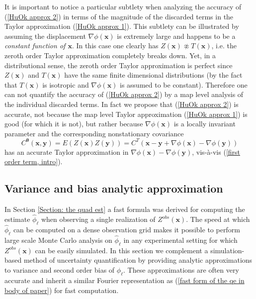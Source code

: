 \documentclass[10pt,noinfoline]{imsart}
\newcommand{\bs}{\boldsymbol}
\begin{document}
It is important to notice a particular subtlety when analyzing the accuracy of  (\ref{HuOk approx 2}) in terms of the magnitude of the discarded terms in the Taylor approximation (\ref{HuOk approx 1}). This subtlety can be illustrated by assuming the displacement $\nabla \phi(\bs x)$ is extremely large and happens to be a \textit{constant function of $\bs x$}. In this case one clearly has $Z(\bs x) \not\approx T(\bs x)$, i.e. the zeroth order Taylor approximation completely breaks down. Yet, in a distributional sense, the zeroth order Taylor approximation is perfect since $Z(\bs x)$ and $T(\bs x)$ have the same finite dimensional distributions (by the fact that $T(\bs x)$ is isotropic and $\nabla \phi(\bs x)$ is assumed to be constant).
Therefore one can not quantify the accuracy of (\ref{HuOk approx 2}) by a map level analysis of the individual discarded terms.
In fact we propose that (\ref{HuOk approx 2}) is accurate, not because the map level Taylor approximation (\ref{HuOk approx 1}) is good (for which it is not), but rather because $\nabla \phi(\bs x)$ is a locally invariant parameter and the corresponding nonstationary covariance
\[
C^{\bs \theta}(\bs x,\bs y)=E(Z(\bs x)Z(\bs y)) = C^T(\bs x - \bs y + \nabla\phi(\bs x) - \nabla\phi(\bs y))
\]
has an accurate Taylor approximation in $\nabla\phi(\bs x) - \nabla\phi(\bs y)$, vis-\`a-vis (\ref{first order term, intro}).



\subsection{Variance and bias analytic approximation}
\label{Section: var and bias}

In Section \ref{Section: the quad est} a fast formula was derived for computing the estimate $\hat \phi_{\bs \ell}$ when observing a single realization of $Z^{obs}(\bs x)$. The speed at which $\hat \phi_{\bs \ell}$ can be computed on a dense observation grid makes it possible to perform large scale Monte Carlo analysis on $\hat\phi_{\bs \ell}$ in any experimental setting for which $Z^{obs}(\bs x)$ can be easily simulated. In this section we complement a simulation-based method of uncertainty quantification by providing analytic approximations to variance and second order bias of $\hat\phi_{\bs \ell}$. These approximations are often very accurate and inherit a similar Fourier representation as (\ref{fast form of the qe in body of paper}) for fast computation.
\end{document}
